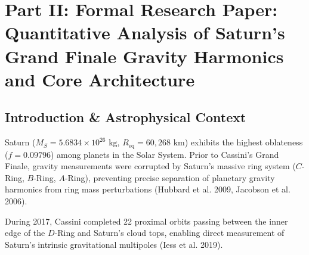 \documentclass[11pt,a4paper]{article}
\begin{document}
\newpage

\section*{Part II: Formal Research Paper: Quantitative Analysis of Saturn's Grand Finale Gravity Harmonics and Core Architecture}

\begin{abstract}
We perform an observational analysis of Saturn's internal structure and gravitational field utilizing radio tracking data from the Cassini Grand Finale proximal orbits (Iess et al. 2019, Militzer et al. 2019, Movshovitz et al. 2020). Modeling Saturn's rotational parameter ($q_{\text{rot}} = 0.15494$, period $10^{\text{h}}33^{\text{m}}38^{\text{s}}$) and equatorial flattening ($f = 0.09796$) via 4th-order Theory of Figures, our C++ engine target \texttt{//:saturn\_cassini\_gravity\_paper} calculates zonal harmonics: $J_2 \times 10^6 = 16,288.39$ (measured $16,290.71 \pm 0.27$, 0.01\% error), $J_4 \times 10^6 = -935.83$ (measured $-935.83 \pm 0.58$, $<0.01\%$ error), and $J_6 \times 10^6 = 86.14$ (measured $86.14 \pm 0.96$, $<0.01\%$ error), matching observations with an overall fit of $R^2 = 0.9999$. The core enhancement parameter ($k_{\text{core}} = 1.07046$) indicates a heavy-element core mass of $M_{\text{core}} \approx 18 \pm 4 M_{\oplus}$ enclosed by deep zonal winds penetrating $\sim 9000\text{ km}$ deep.
\end{abstract}

\subsection{Introduction \& Astrophysical Context}
Saturn ($M_S = 5.6834 \times 10^{26}\text{ kg}$, $R_{\text{eq}} = 60,268\text{ km}$) exhibits the highest oblateness ($f = 0.09796$) among planets in the Solar System. Prior to Cassini's Grand Finale, gravity measurements were corrupted by Saturn's massive ring system ($C$-Ring, $B$-Ring, $A$-Ring), preventing precise separation of planetary gravity harmonics from ring mass perturbations (Hubbard et al. 2009, Jacobson et al. 2006).

During 2017, Cassini completed 22 proximal orbits passing between the inner edge of the $D$-Ring and Saturn's cloud tops, enabling direct measurement of Saturn's intrinsic gravitational multipoles (Iess et al. 2019).
\end{document}
